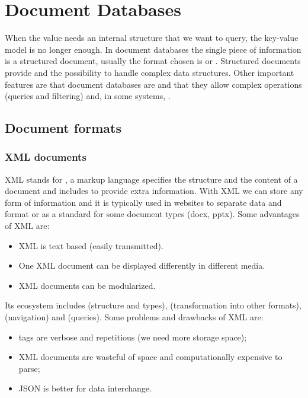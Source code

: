 \section{Document Databases}\label{sec:document}

When the value needs an internal structure that we want to query, the key-value model is no longer enough. In document databases the single piece of information is a structured document, usually the format chosen is  or . Structured documents provide  and the possibility to handle complex data structures. Other important features are that document databases are  and that they allow complex operations (queries and filtering) and, in some systems, .

\subsection{Document formats}

\subsubsection{XML documents}
XML stands for , a markup language specifies the structure and the content of a document and includes  to provide extra information. With XML we can store any form of information and it is typically used in websites to separate data and format or as a standard for some document types (docx, pptx). Some advantages of XML are:
\begin{itemize}
    \item XML is text based (easily transmitted).
    \item One XML document can be displayed differently in different media.
    \item XML documents can be modularized.
\end{itemize}

Its ecosystem includes  (structure and types),  (transformation into other formats),  (navigation) and  (queries). Some problems and drawbacks of XML are:
\begin{itemize}
    \item tags are verbose and repetitious (we need more storage space);
    \item XML documents are wasteful of space and computationally expensive to parse;
    \item JSON is better for data interchange.
\end{itemize}

